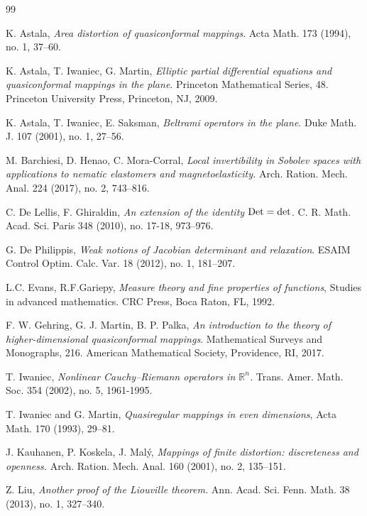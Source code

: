 \documentclass[reqno,11pt]{amsart}
\numberwithin{equation}{section}
\theoremstyle{remark}
\begin{document}
\begin{thebibliography}{99}

K. Astala, \emph{Area distortion of quasiconformal mappings}. Acta Math. 173 (1994), no. 1, 37--60.


K. Astala, T. Iwaniec, G. Martin, \emph{Elliptic partial differential equations and quasiconformal mappings in the plane}. Princeton Mathematical Series, 48. Princeton University Press, Princeton, NJ, 2009.

K. Astala, T. Iwaniec, E. Saksman,  \emph{Beltrami operators in the plane}. Duke Math. J. 107 (2001), no. 1, 27--56.

M. Barchiesi, D. Henao, C. Mora-Corral, 
\emph{Local invertibility in Sobolev spaces with applications to nematic elastomers and magnetoelasticity.}
Arch. Ration. Mech. Anal. 224 (2017), no. 2, 743--816.


C. De Lellis,  F. Ghiraldin,  \emph{An extension of the identity $\rm Det=det$}. C. R. Math. Acad. Sci. Paris 348 (2010), no. 17-18, 973--976.

G. De Philippis, 
\emph{Weak notions of Jacobian determinant and relaxation}. 
ESAIM Control Optim. Calc. Var. 18 (2012), no. 1, 181--207.

L.C. Evans, R.F.Gariepy, \emph{Measure theory and fine properties of functions}, Studies in advanced mathematics. CRC Press, Boca Raton, FL, 1992.

F. W. Gehring, G. J. Martin, B. P. Palka, 
\emph{An introduction to the theory of higher-dimensional quasiconformal mappings}.
Mathematical Surveys and Monographs, 216. American Mathematical Society, Providence, RI, 2017.

T. Iwaniec, \emph{Nonlinear Cauchy--Riemann operators in $\mathbb R^n$.}
Trans. Amer. Math. Soc. 354 (2002), no. 5, 1961-1995.

T. Iwaniec and G. Martin, \emph{Quasiregular mappings in even dimensions}, Acta Math. 170 (1993), 29--81.

J. Kauhanen, P. Koskela, J. Mal\'y, 
\emph{Mappings of finite distortion: discreteness and openness.}
Arch. Ration. Mech. Anal. 160 (2001), no. 2, 135--151.


 
Z. Liu, 
\emph{Another proof of the Liouville theorem.}
Ann. Acad. Sci. Fenn. Math. 38 (2013), no. 1, 327--340.



\end{thebibliography}
\end{document}
